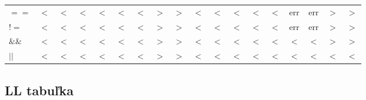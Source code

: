 \documentclass{article}
\begin{document}
\begin{table}[H]
\begin{tabular}{l *{17}{c}}
    $==$ & $<$ & $<$ & $<$ & $<$ & $<$ & $<$ & $>$ & $>$ & $<$ & $<$ & $<$ & $<$ & $<$ & $\mathrm{err}$ & $\mathrm{err}$ & $>$ & $>$ \\
    $!=$ & $<$ & $<$ & $<$ & $<$ & $<$ & $<$ & $>$ & $>$ & $<$ & $<$ & $<$ & $<$ & $<$ & $\mathrm{err}$ & $\mathrm{err}$ & $>$ & $>$ \\
    $\&\&$ & $<$ & $<$ & $<$ & $<$ & $<$ & $<$ & $>$ & $>$ & $<$ & $<$ & $<$ & $<$ & $<$ & $<$ & $<$ & $>$ & $>$ \\
    $||$ & $<$ & $<$ & $<$ & $<$ & $<$ & $<$ & $>$ & $>$ & $<$ & $<$ & $<$ & $<$ & $<$ & $<$ & $<$ & $<$ & $<$ \\
    \bottomrule
  \end{tabular}
\end{table}

\clearpage
\subsection{LL tabuľka}
\label{sec:precedencna-tabulka}
\end{document}
